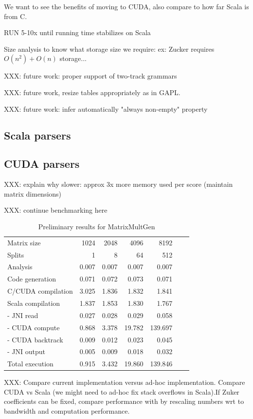 \documentclass[11pt]{article}
\begin{document}
{\color{red} We want to see the benefits of moving to CUDA, also compare to how far Scala is from C.}

RUN 5-10x until running time stabilizes on Scala

 {\color{red} Size analysis to know what storage size we require: ex: Zucker requires $O(n^2)+O(n)$ storage...}

XXX: future work: proper support of two-track grammars

XXX: future work, resize tables appropriately as in GAPL.

XXX: future work: infer automatically "always non-empty" property

\subsection{Scala parsers}

\subsection{CUDA parsers}
{\color{red} XXX: explain why slower: approx 3x more memory used per score (maintain matrix dimensions)

XXX: continue benchmarking here
}
\begin{table}[H]\begin{center}\begin{tabular}{lrrrrrr} \toprule
Matrix size			& 1024	& 2048	& 4096	& 8192 \\
Splits				& 1		& 8		& 64		& 512 \\ \midrule
Analysis				& 0.007	& 0.007	& 0.007	& 0.007 \\
Code generation		& 0.071	& 0.072	& 0.073	& 0.071 \\
C/CUDA compilation	& 3.025	& 1.836	& 1.832	& 1.841 \\
Scala compilation		& 1.837	& 1.853	& 1.830	& 1.767 \\ \midrule
- JNI read				& 0.027	& 0.028	& 0.029	& 0.058 \\
- CUDA compute		& 0.868	& 3.378	& 19.782	& 139.697 \\
- CUDA backtrack		& 0.009	& 0.012	& 0.023	& 0.045 \\
- JNI output			& 0.005	& 0.009	& 0.018	& 0.032 \\
Total execution			& 0.915	& 3.432	& 19.860	& 139.846 \\ \bottomrule
\end{tabular}\end{center}\caption{Preliminary results for MatrixMultGen}\end{table}

{\color{red} XXX: Compare current implementation versus ad-hoc implementation. Compare CUDA vs Scala (we might need to ad-hoc fix stack overflows in Scala).If Zuker coefficients can be fixed, compare performance with \cite{adp_gpu} by rescaling numbers wrt to bandwidth and computation performance.}
\end{document}
